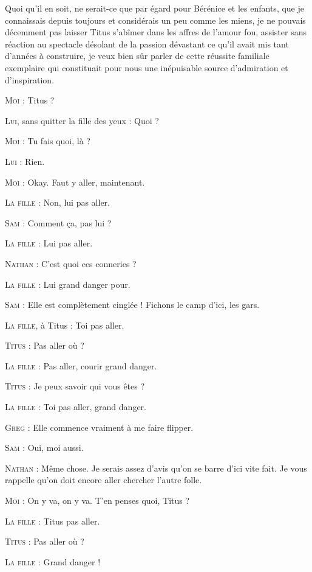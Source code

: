 Quoi qu’il en soit, ne serait-ce que par égard pour Bérénice et les enfants, que je connaissais depuis toujours et considérais un peu comme les miens, je ne pouvais décemment pas laisser Titus s’abîmer dans les affres de l’amour fou, assister sans réaction au spectacle désolant de la passion dévastant ce qu’il avait mis tant d’années à construire, je veux bien sûr parler de cette réussite familiale exemplaire qui constituait pour nous une inépuisable source d’admiration et d’inspiration.

\begin{dialogue}

\textsc{Moi} : Titus ?

\textsc{Lui}, sans quitter la fille des yeux : Quoi ?

\textsc{Moi} : Tu fais quoi, là ?

\textsc{Lui} : Rien.

\textsc{Moi} : Okay. Faut y aller, maintenant.

\textsc{La fille} : Non, lui pas aller.

\textsc{Sam} : Comment ça, pas lui ?

\textsc{La fille} : Lui pas aller.

\textsc{Nathan} : C’est quoi ces conneries ?

\textsc{La fille} : Lui grand danger pour.

\textsc{Sam} : Elle est complètement cinglée ! Fichons le camp d’ici, les gars.

\textsc{La fille}, à Titus : Toi pas aller.

\textsc{Titus} : Pas aller où ?

\textsc{La fille} : Pas aller, courir grand danger.

\textsc{Titus} : Je peux savoir qui vous êtes ?

\textsc{La fille} : Toi pas aller, grand danger.

\textsc{Greg} : Elle commence vraiment à me faire flipper.

\textsc{Sam} : Oui, moi aussi.

\textsc{Nathan} : Même chose. Je serais assez d’avis qu’on se barre d’ici vite fait. Je vous rappelle qu’on doit encore aller chercher l’autre folle.

\textsc{Moi} : On y va, on y va. T’en penses quoi, Titus ?

\textsc{La fille} : Titus pas aller.

\textsc{Titus} : Pas aller où ?

\textsc{La fille} : Grand danger !


\end{dialogue}
